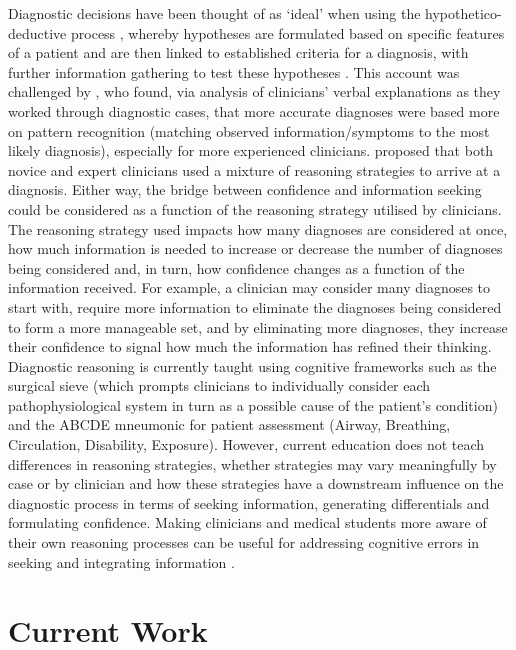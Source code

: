 \documentclass[a4paper, nobind]{templates/ociamthesis}
\begin{document}
\hfill\break
Diagnostic decisions have been thought of as `ideal' when using the hypothetico-deductive process \autocite{kuipers_causal_1984}, whereby hypotheses are formulated based on specific features of a patient and are then linked to established criteria for a diagnosis, with further information gathering to test these hypotheses \autocite{higgs_clinical_2019}. This account was challenged by \textcite{coderre_diagnostic_2003}, who found, via analysis of clinicians' verbal explanations as they worked through diagnostic cases, that more accurate diagnoses were based more on pattern recognition (matching observed information/symptoms to the most likely diagnosis), especially for more experienced clinicians. \autocite{gilhooly_cognitive_1990} proposed that both novice and expert clinicians used a mixture of reasoning strategies to arrive at a diagnosis. Either way, the bridge between confidence and information seeking could be considered as a function of the reasoning strategy utilised by clinicians. The reasoning strategy used impacts how many diagnoses are considered at once, how much information is needed to increase or decrease the number of diagnoses being considered and, in turn, how confidence changes as a function of the information received. For example, a clinician may consider many diagnoses to start with, require more information to eliminate the diagnoses being considered to form a more manageable set, and by eliminating more diagnoses, they increase their confidence to signal how much the information has refined their thinking. Diagnostic reasoning is currently taught using cognitive frameworks such as the surgical sieve (which prompts clinicians to individually consider each pathophysiological system in turn as a possible cause of the patient's condition) and the ABCDE mneumonic for patient assessment (Airway, Breathing, Circulation, Disability, Exposure). However, current education does not teach differences in reasoning strategies, whether strategies may vary meaningfully by case or by clinician and how these strategies have a downstream influence on the diagnostic process in terms of seeking information, generating differentials and formulating confidence. Making clinicians and medical students more aware of their own reasoning processes can be useful for addressing cognitive errors in seeking and integrating information \autocite{nendaz_diagnostic_2012}.

\section{Current Work}\label{current-work}
\end{document}
